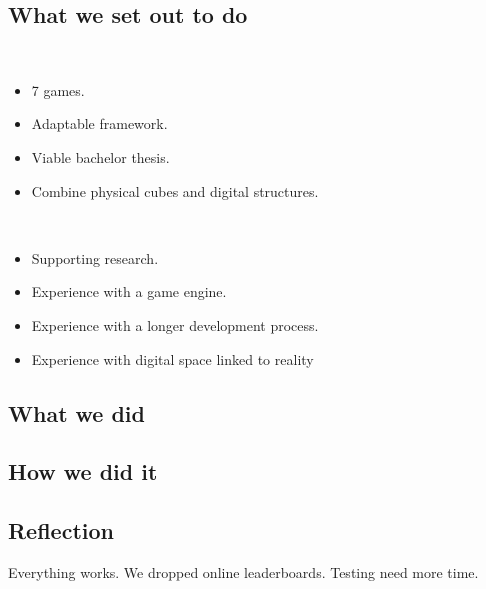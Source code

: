 \subsection{What we set out to do}

\begin{description}
	\item {}

	\item[Result goals]\ 
	\begin{itemize}
		\item 7 games.
		\item Adaptable framework.
		\item Viable bachelor thesis.
		\item Combine physical cubes and digital structures.
	\end{itemize}
	\item[Effect goals]\ 
	\begin{itemize}
		\item Supporting research.
		\item Experience with a game engine.
		\item Experience with a longer development process.
		\item Experience with digital space linked to reality
	\end{itemize}
\end{description}


\subsection{What we did}

\subsection{How we did it}

\subsection{Reflection}
Everything works.
We dropped online leaderboards.
Testing need more time.